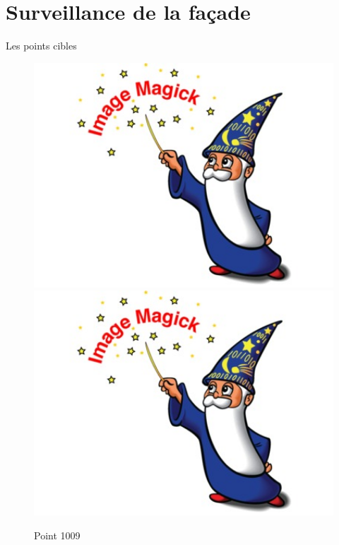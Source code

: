 \documentclass[french]{article}
\begin{document}
\section{Surveillance de la façade}
Les points cibles
\begin{figure}[!h]
\centering
\includegraphics[bb=0 0 400 300,width=400pt,keepaspectratio=true]{test.jpg}
\includegraphics[bb=0 0 400 300,viewport=0 0 400 300,width=400pt,keepaspectratio=true]{test.jpg}
\caption{Point 1009}
\label{mydessin1}
\end{figure}
\end{document}
